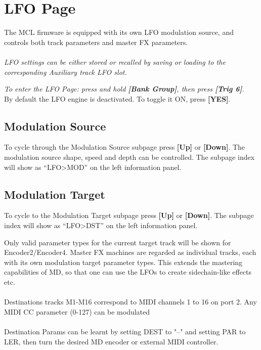 \chapter{LFO Page}
The MCL firmware is equipped with its own LFO modulation source, and controls both track parameters and master FX parameters.\\\\\textit{LFO settings can be either stored or recalled by saving or loading to the corresponding Auxiliary track LFO slot.}

\textit{To enter the LFO Page: press and hold \textbf{[Bank Group]}, then press \textbf{[Trig 6]}.}
\\
By default the LFO engine is deactivated. To toggle it ON, press \textbf{[YES]}.
\section{Modulation Source}

To cycle through the Modulation Source subpage press \textbf{[Up] }or \textbf{[Down]}. The modulation source shape, speed and depth can be controlled. The subpage index will show as ``LFO>MOD'' on the left information panel.


\newpage


\section{Modulation Target}
To cycle to the Modulation Target subpage press \textbf{[Up] }or \textbf{[Down]}. The subpage index will show as ``LFO>DST'' on the left information panel.


Only valid parameter types for the current target track will be shown for Encoder2/Encoder4. Master FX machines are regarded as individual tracks, each with its own modulation target parameter types. This extends the mastering capabilities of MD, so that one can use the LFOs to create sidechain-like effects etc.
\\\\
Destinations tracks M1-M16 correspond to MIDI channels 1 to 16 on port 2. Any MIDI CC parameter (0-127) can be modulated
\\\\
Destination Params can be learnt by setting DEST to "--" and setting PAR to LER, then turn the desired MD encoder or external MIDI controller.

